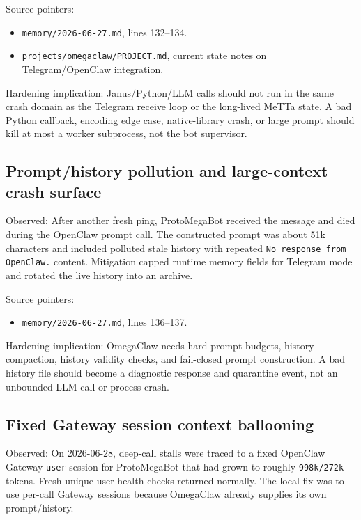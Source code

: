 \documentclass[11pt]{article}
\begin{document}
Source pointers:
\begin{itemize}
  \item \texttt{memory/2026-06-27.md}, lines 132--134.
  \item \texttt{projects/omegaclaw/PROJECT.md}, current state notes on Telegram/OpenClaw integration.
\end{itemize}

Hardening implication: Janus/Python/LLM calls should not run in the same crash domain as the Telegram receive loop or the long-lived MeTTa state. A bad Python callback, encoding edge case, native-library crash, or large prompt should kill at most a worker subprocess, not the bot supervisor.

\subsection{Prompt/history pollution and large-context crash surface}

Observed: After another fresh ping, ProtoMegaBot received the message and died during the OpenClaw prompt call. The constructed prompt was about 51k characters and included polluted stale history with repeated \texttt{No response from OpenClaw.} content. Mitigation capped runtime memory fields for Telegram mode and rotated the live history into an archive.

Source pointers:
\begin{itemize}
  \item \texttt{memory/2026-06-27.md}, lines 136--137.
\end{itemize}

Hardening implication: OmegaClaw needs hard prompt budgets, history compaction, history validity checks, and fail-closed prompt construction. A bad history file should become a diagnostic response and quarantine event, not an unbounded LLM call or process crash.

\subsection{Fixed Gateway session context ballooning}

Observed: On 2026-06-28, deep-call stalls were traced to a fixed OpenClaw Gateway \texttt{user} session for ProtoMegaBot that had grown to roughly \texttt{998k/272k} tokens. Fresh unique-user health checks returned normally. The local fix was to use per-call Gateway sessions because OmegaClaw already supplies its own prompt/history.
\end{document}
